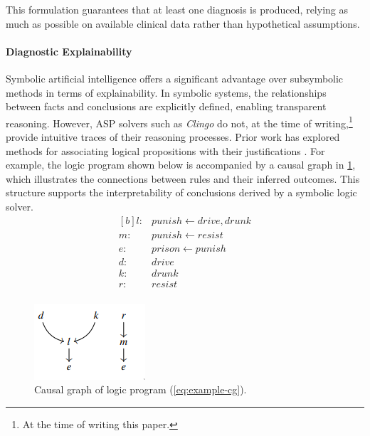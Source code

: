 \documentclass[10pt,leqno]{amsart}
\begin{document}
This formulation guarantees that at least one diagnosis is produced, 
relying as much as possible on available clinical data rather than hypothetical assumptions.

\paragraph{\textbf{Diagnostic Explainability}}

Symbolic artificial intelligence offers a significant advantage 
over subsymbolic methods in terms of explainability. 
In symbolic systems, the relationships between facts and conclusions are explicitly defined, 
enabling transparent reasoning. However, ASP solvers such as \textit{Clingo} do not, 
at the time of writing,\footnote{At the time of writing this paper.} 
provide intuitive traces of their reasoning processes. 
Prior work has explored methods for associating logical propositions 
with their justifications \cite{cabalar2014causal}. For example, 
the logic program shown below is accompanied by a causal graph 
in \cref{fig:causal-g}, which illustrates the connections 
between rules and their inferred outcomes. 
This structure supports the interpretability of conclusions derived by a symbolic logic solver.
\begin{equation}
\begin{aligned}[b]
    l :& punish \longleftarrow drive, drunk \\
    m :& punish \longleftarrow resist \\
    e :& prison \longleftarrow punish \\
    d :& drive \\
    k :& drunk \\
    r :& resist \\
\end{aligned}
\label{eq:example-cg}
\end{equation}

\begin{figure}
    \centering
    \includegraphics{assets/causal_g.png}
    \caption{Causal graph of logic program (\cref{eq:example-cg}).}
    \label{fig:causal-g}
\end{figure}
\end{document}
